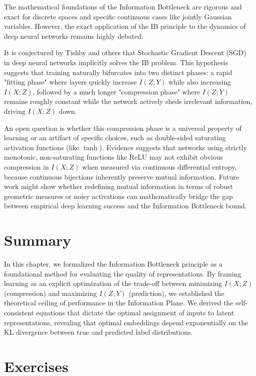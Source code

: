 \begin{horizon}
The mathematical foundations of the Information Bottleneck are rigorous and exact for discrete spaces and specific continuous cases like jointly Gaussian variables. However, the exact application of the IB principle to the dynamics of deep neural networks remains highly debated.

It is conjectured by Tishby and others that Stochastic Gradient Descent (SGD) in deep neural networks implicitly solves the IB problem. This hypothesis suggests that training naturally bifurcates into two distinct phases: a rapid "fitting phase" where layers quickly increase $I(Z; Y)$ while also increasing $I(X; Z)$, followed by a much longer "compression phase" where $I(Z; Y)$ remains roughly constant while the network actively sheds irrelevant information, driving $I(X; Z)$ down. 

An open question is whether this compression phase is a universal property of learning or an artifact of specific choices, such as double-sided saturating activation functions (like $\tanh$). Evidence suggests that networks using strictly monotonic, non-saturating functions like ReLU may not exhibit obvious compression in $I(X; Z)$ when measured via continuous differential entropy, because continuous bijections inherently preserve mutual information. Future work might show whether redefining mutual information in terms of robust geometric measures or noisy activations can mathematically bridge the gap between empirical deep learning success and the Information Bottleneck bound.
\end{horizon}

\section{Summary}

In this chapter, we formalized the Information Bottleneck principle as a foundational method for evaluating the quality of representations. By framing learning as an explicit optimization of the trade-off between minimizing $I(X; Z)$ (compression) and maximizing $I(Z; Y)$ (prediction), we established the theoretical ceiling of performance in the Information Plane. We derived the self-consistent equations that dictate the optimal assignment of inputs to latent representations, revealing that optimal embeddings depend exponentially on the KL divergence between true and predicted label distributions. 

\section*{Exercises}

